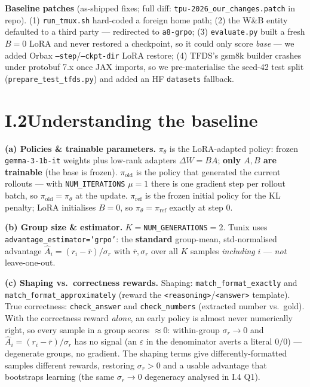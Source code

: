 \documentclass[11pt]{article}
\newcommand{\code}[1]{\texttt{#1}}
\begin{document}
\textbf{Baseline patches} (as-shipped fixes; full diff: \code{tpu-2026\_our\_changes.patch} in repo).
(1) \code{run\_tmux.sh} hard-coded a foreign home path; (2) the W\&B entity defaulted to a third party --- redirected to \code{a8-grpo};
(3) \code{evaluate.py} built a fresh $B{=}0$ LoRA and never restored a checkpoint, so it could only score \emph{base} --- we added Orbax
\code{--step}/\code{--ckpt-dir} LoRA restore; (4) TFDS's gsm8k builder crashes under protobuf 7.x once JAX imports, so we pre-materialise
the seed-42 test split (\code{prepare\_test\_tfds.py}) and added an HF \code{datasets} fallback.

\section*{I.2\quad Understanding the baseline}
\textbf{(a) Policies \& trainable parameters.} $\pi_\theta$ is the LoRA-adapted policy: frozen \code{gemma-3-1b-it} weights plus low-rank
adapters $\Delta W{=}BA$; \textbf{only $A,B$ are trainable} (the base is frozen). $\pi_{\mathrm{old}}$ is the policy that generated the current
rollouts --- with \code{NUM\_ITERATIONS} $\mu{=}1$ there is one gradient step per rollout batch, so $\pi_{\mathrm{old}}{=}\pi_\theta$ at the update.
$\pi_{\mathrm{ref}}$ is the frozen initial policy for the KL penalty; LoRA initialises $B{=}0$, so $\pi_\theta{=}\pi_{\mathrm{ref}}$ exactly at step 0.

\textbf{(b) Group size \& estimator.} $K{=}$\code{NUM\_GENERATIONS}$=2$. Tunix uses \code{advantage\_estimator='grpo'}: the \textbf{standard}
group-mean, std-normalised advantage $\hat A_i{=}(r_i-\bar r)/\sigma_r$ with $\bar r,\sigma_r$ over all $K$ samples \emph{including} $i$ --- \emph{not}
leave-one-out.

\textbf{(c) Shaping vs.\ correctness rewards.} Shaping: \code{match\_format\_exactly} and \code{match\_format\_approximately} (reward the
\code{<reasoning>}/\code{<answer>} template). True correctness: \code{check\_answer} and \code{check\_numbers} (extracted number vs.\ gold).
With the correctness reward \emph{alone}, an early policy is almost never numerically right, so every sample in a group scores $\approx 0$:
within-group $\sigma_r\!\to\!0$ and $\hat A_i{=}(r_i-\bar r)/\sigma_r$ has no signal (an $\varepsilon$ in the denominator averts a literal $0/0$) --- degenerate groups, no gradient. The shaping terms give
differently-formatted samples different rewards, restoring $\sigma_r>0$ and a usable advantage that bootstraps learning (the same
$\sigma_r\!\to\!0$ degeneracy analysed in I.4 Q1).
\end{document}
